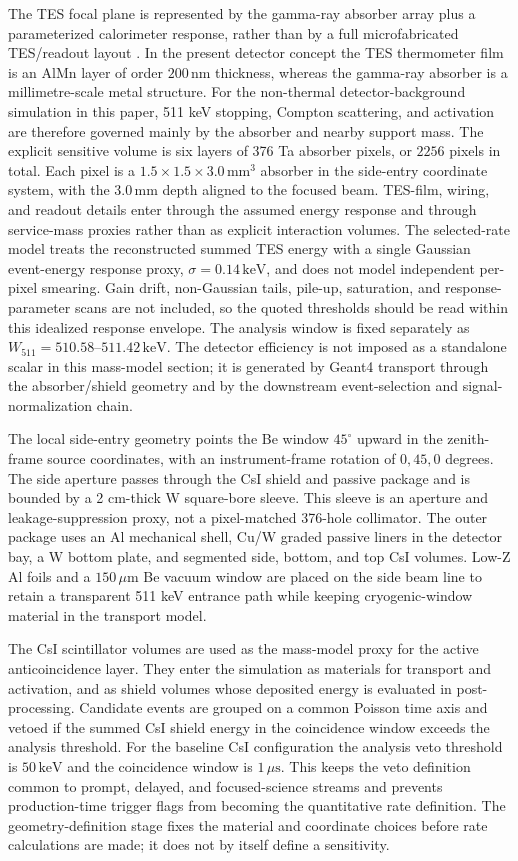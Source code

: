 \documentclass[preprint,12pt]{elsarticle}
\newcommand{\keV}{\,\mathrm{keV}}
\newcommand{\wii}{W_{511}}
\begin{document}
The TES focal plane is represented by the gamma-ray absorber array plus a parameterized calorimeter response, rather than by a full microfabricated TES/readout layout \cite{Zhang2022TESGamma}. In the present detector concept the TES thermometer film is an AlMn layer of order $200\,\mathrm{nm}$ thickness, whereas the gamma-ray absorber is a millimetre-scale metal structure. For the non-thermal detector-background simulation in this paper, 511 keV stopping, Compton scattering, and activation are therefore governed mainly by the absorber and nearby support mass. The explicit sensitive volume is six layers of 376 Ta absorber pixels, or $2256$ pixels in total. Each pixel is a $1.5\times1.5\times3.0\,\mathrm{mm^3}$ absorber in the side-entry coordinate system, with the $3.0\,\mathrm{mm}$ depth aligned to the focused beam. TES-film, wiring, and readout details enter through the assumed energy response and through service-mass proxies rather than as explicit interaction volumes. The selected-rate model treats the reconstructed summed TES energy with a single Gaussian event-energy response proxy, $\sigma=0.14\keV$, and does not model independent per-pixel smearing. Gain drift, non-Gaussian tails, pile-up, saturation, and response-parameter scans are not included, so the quoted thresholds should be read within this idealized response envelope. The analysis window is fixed separately as $\wii=510.58$--$511.42\keV$. The detector efficiency is not imposed as a standalone scalar in this mass-model section; it is generated by Geant4 transport through the absorber/shield geometry and by the downstream event-selection and signal-normalization chain.

The local side-entry geometry points the Be window $45^\circ$ upward in the zenith-frame source coordinates, with an instrument-frame rotation of $0,45,0$ degrees. The side aperture passes through the CsI shield and passive package and is bounded by a 2 cm-thick W square-bore sleeve. This sleeve is an aperture and leakage-suppression proxy, not a pixel-matched 376-hole collimator. The outer package uses an Al mechanical shell, Cu/W graded passive liners in the detector bay, a W bottom plate, and segmented side, bottom, and top CsI volumes. Low-Z Al foils and a $150\,\mu\mathrm{m}$ Be vacuum window are placed on the side beam line to retain a transparent 511 keV entrance path while keeping cryogenic-window material in the transport model.

The CsI scintillator volumes are used as the mass-model proxy for the active anticoincidence layer. They enter the simulation as materials for transport and activation, and as shield volumes whose deposited energy is evaluated in post-processing. Candidate events are grouped on a common Poisson time axis and vetoed if the summed CsI shield energy in the coincidence window exceeds the analysis threshold. For the baseline CsI configuration the analysis veto threshold is $50\keV$ and the coincidence window is $1\,\mu\mathrm{s}$. This keeps the veto definition common to prompt, delayed, and focused-science streams and prevents production-time trigger flags from becoming the quantitative rate definition. The geometry-definition stage fixes the material and coordinate choices before rate calculations are made; it does not by itself define a sensitivity.
\end{document}

